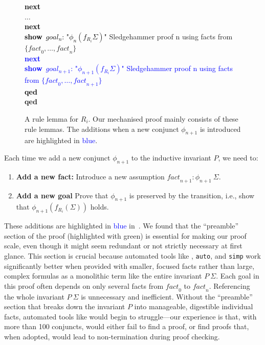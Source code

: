 \documentclass[10pt,conference]{IEEEtran}
\newcommand{\StateSymbol}{\Sigma}
\newcommand\auto{\texttt{auto}}
\newcommand\simp{\texttt{simp}}
\newcommand{\isakw}[1]{{\bfseries\ttfamily\def\isachardot{.}\def\isacharunderscore{\isacharunderscorekeyword}%
\def\isacharbraceleft{\{}\def\isacharbraceright{\}}#1}}
\renewcommand{\isacommand}[1]{\textcolor{IsaBlue}{\isakw{#1}}}
\begin{document}
\begin{figure}
\begin{isabelle}
\textcolor{black}{\hspace*{1em}\isacommand{next}} \\
\hspace*{2em}$\ldots$\\
\textcolor{black}{\hspace*{1em}\isacommand{next}} \\
\textcolor{black}{\hspace*{2em}\isacommand{show}\ $\mathit{goal_n}$: "$\phi_n(f_{R_i} \StateSymbol{})$"}  Sledgehammer proof n using facts from $\{\textit{fact}_0,\ldots ,\textit{fact}_n\}$ \\
\textcolor{blue}{\hspace*{1em}\protect\isacommand{next}} \\
\textcolor{blue}{\hspace*{2em}\protect\isacommand{show}\ $\mathit{goal_{n+1}}$: "$\phi_{n+1}(f_{R_i} \StateSymbol{})$"}  \textcolor{blue}{Sledgehammer proof n using facts from $\{\textit{fact}_0,\ldots ,\textit{fact}_{n+1}\}$} \\
\textcolor{black}{\hspace*{1em}\isacommand{qed}} \\
\isacommand{qed}
\end{isabelle}
\caption{A rule lemma for $R_i$. Our mechanised proof mainly consists of these rule lemmas. The additions when a new conjunct $\phi_{n+1}$ is introduced are highlighted in \textcolor{blue}{blue}.}\label{fig:rulelemma}
\end{figure}
\noindent Each time we add a new conjunct $\phi_{n+1}$ to the inductive invariant $P$, we need to:
\begin{enumerate}
    \item \textbf{Add a new fact:} Introduce a new assumption $\textit{fact}_{n+1}\colon \phi_{n+1}\ \StateSymbol{}$.
    \item \textbf{Add a new goal} Prove that $\phi_{n+1}$ is preserved by the transition, i.e., show that $\phi_{n+1}(f_{R_i}(\StateSymbol{}))$ holds.
\end{enumerate}
\noindent These additions are highlighted in \textcolor{blue}{blue} in~. We found that the ``preamble'' section of the proof (highlighted with \textcolor{colorpreamble}{green}) is essential for making our proof scale, even though it might seem redundant or not strictly necessary at first glance. This section is crucial because automated tools like \sledgehammer{}, \auto{}, and \simp{} work significantly better when provided with smaller, focused facts rather than large, complex formulas as a monolithic term like the entire invariant $P\ \StateSymbol{}$. Each goal in this proof often depends on only several facts from  $\textit{fact}_0$ to $\textit{fact}_n$. Referencing the whole invariant $P\ \StateSymbol{}$ is unnecessary and inefficient. Without the ``preamble'' section that breaks down the invariant $P$ into manageable, digestible individual facts, automated tools like \sledgehammer{} would begin to struggle---our experience is that, with more than 100 conjuncts, \sledgehammer{} would either fail to find a proof, or find proofs that, when adopted, would lead to non-termination during proof checking.
\end{document}
